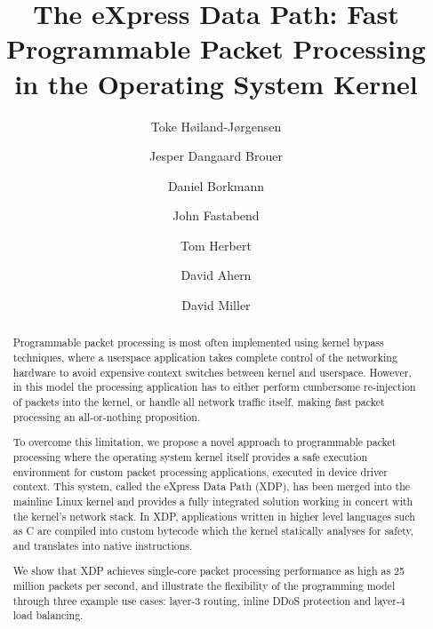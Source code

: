 \documentclass[10pt,sigconf,anonymous]{acmart}
\begin{document}
\title{The eXpress Data Path: Fast Programmable Packet Processing in the
  Operating System Kernel}
\author{Toke Høiland-Jørgensen}

\author{Jesper Dangaard Brouer}

\author{Daniel Borkmann}

\author{John Fastabend}

\author{Tom Herbert}

\author{David Ahern}

\author{David Miller}

\renewcommand{\shortauthors}{T. Høiland-Jørgensen et al.}
\renewcommand{\shorttitle}{The eXpress Data Path}
\captionsetup{font+=small}

\begin{abstract}
  Programmable packet processing is most often implemented using kernel bypass
  techniques, where a userspace application takes complete control of the
  networking hardware to avoid expensive context switches between kernel and
  userspace. However, in this model the processing application has to either
  perform cumbersome re-injection of packets into the kernel, or handle all
  network traffic itself, making fast packet processing an all-or-nothing
  proposition.

  To overcome this limitation, we propose a novel approach to programmable
  packet processing where the operating system kernel itself provides a safe
  execution environment for custom packet processing applications, executed in
  device driver context. This system, called the eXpress Data Path (XDP), has
  been merged into the mainline Linux kernel and provides a fully integrated
  solution working in concert with the kernel's network stack. In XDP,
  applications written in higher level languages such as C are compiled into
  custom bytecode which the kernel statically analyses for safety, and
  translates into native instructions.

  We show that XDP achieves single-core packet processing performance as high as
  25 million packets per second, and illustrate the flexibility of the
  programming model through three example use cases: layer-3 routing, inline
  DDoS protection and layer-4 load balancing.
\end{abstract}
\end{document}
